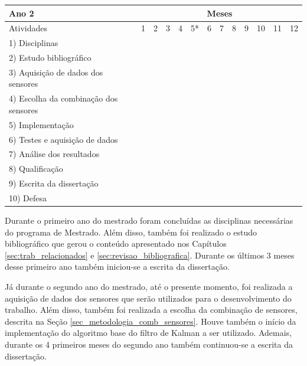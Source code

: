 \documentclass[acronym, symbols, table]{fei}
\begin{document}
\begin{table}[!htb]
			\begin{tabular}{>{\raggedright}p{}|c|c|c|c|c|c|c|c|c|c|c|c|}
				\cline{2-13}
				Ano 2 & \multicolumn{12}{c|}{Meses} \\ \hline
				Atividades                       				 & 1 &  2 &  3 &  4 &  5* &  6 &  7 &  8 &  9 & 10 & 11 & 12 \\ \hline \hline
				\small 1) Disciplinas   			 			 &    &    &    &    &    &    &    &    &    &    &    &    \\ \hline
				\small 2) Estudo bibliográfico   				 & \X & \X & \X & \X & \X &    &    &    &    &    &    &    \\ \hline
				\small 3) Aquisição de dados dos sensores        & \X & \X &    &    &    &    &    &    &    &    &    &    \\ \hline
				\small 4) Escolha da combinação dos sensores   	 &    & \X & \X &    &    &    &    &    &    &    &    &    \\ \hline
				\small 5) Implementação   	 					 &    &    & \X & \X & \X & \X & \X & \X &    &    &    &    \\ \hline
				\small 6) Testes e aquisição de dados   		 &    &    &    &    & \X & \X & \X & \X & \X & \X &    &    \\ \hline
				\small 7) Análise dos resultados   			 	 &    &    &    &    &    & \X & \X & \X & \X & \X &    &    \\ \hline
				\small 8) Qualificação   			 	 		 &    &    &    &    & \X &    &    &    &    &    &    &    \\ \hline
				\small 9) Escrita da dissertação   				 & \X & \X & \X & \X &    &    &    &    & \X & \X & \X & \X \\ \hline
				\small 10) Defesa   				 				 &    &    &    &    &    &    &    &    &    &    &    & \X \\ \hline \hline				
			\end{tabular}
		\end{table}
		
		Durante o primeiro ano do mestrado foram concluídas as disciplinas necessárias do programa de Mestrado. Além disso, também foi realizado o estudo bibliográfico que gerou o conteúdo apresentado nos Capítulos \ref{sec:trab_relacionados} e \ref{sec:revisao_bibliografica}. Durante os últimos 3 meses desse primeiro ano também iniciou-se a escrita da dissertação.
		
		Já durante o segundo ano do mestrado, até o presente momento, foi realizada a aquisição de dados dos sensores que serão utilizados para o desenvolvimento do trabalho. Além disso, também foi realizada a escolha da combinação de sensores, descrita na Seção \ref{sec_metodologia_comb_sensores}. Houve também o início da implementação do algoritmo base do filtro de Kalman a ser utilizado. Ademais, durante os 4 primeiros meses do segundo ano também continuou-se a escrita da dissertação.
		
\end{document}
